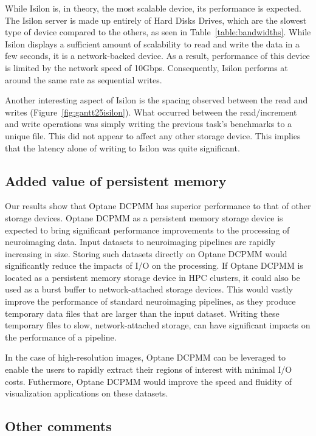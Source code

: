 \documentclass[conference]{IEEEtran}
\begin{document}
While Isilon is, in theory, the most scalable device, its performance is expected. The Isilon
server is made up entirely of Hard Disks Drives, which are the slowest type of device compared to
the others, as seen in Table~\ref{table:bandwidths}. While Isilon displays a sufficient amount of
scalability to read and write the data in a few seconds, it is a network-backed device. As a result,
performance of this device is limited by the network speed of 10Gbps. Consequently, Isilon performs at around
the same rate as sequential writes.

Another interesting aspect of Isilon is the spacing observed between the read and writes
(Figure~\ref{fig:gantt25isilon}). What occurred between the read/increment and
write operations was simply writing the previous task's benchmarks to a unique
file. This did not appear to affect any other storage device. This implies
that the latency alone of writing to Isilon was quite significant.

\subsection{Added value of persistent memory}

Our results show that Optane DCPMM has superior performance to that of other storage devices.
Optane DCPMM as a persistent memory storage device is expected to bring significant
performance improvements to the processing of neuroimaging data. Input datasets to neuroimaging pipelines
are rapidly increasing in size. Storing such datasets directly on Optane DCPMM would significantly reduce the
impacts of I/O on the processing. If Optane DCPMM is located as a persistent memory
storage device in HPC clusters,
it could also be used as a burst buffer to network-attached storage devices. This would vastly
improve the performance of standard neuroimaging pipelines, as they produce temporary data files that 
are larger than the input dataset. Writing these temporary files to slow, network-attached storage, can have
significant impacts on the performance of a pipeline.

In the case of high-resolution images, Optane DCPMM can be leveraged to enable the users to rapidly
extract their regions of interest with minimal I/O costs. Futhermore, Optane DCPMM would improve the
speed and fluidity of visualization applications on these datasets.

\subsection{Other comments}
\end{document}
